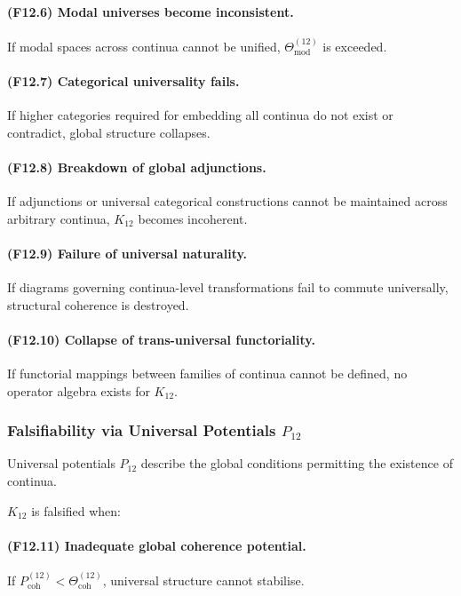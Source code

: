 \paragraph{(F12.6) Modal universes become inconsistent.}
If modal spaces across continua cannot be unified,  
$\Theta_{\mathrm{mod}}^{(12)}$ is exceeded.

\paragraph{(F12.7) Categorical universality fails.}
If higher categories required for embedding all continua do not exist or
contradict, global structure collapses.

\paragraph{(F12.8) Breakdown of global adjunctions.}
If adjunctions or universal categorical constructions cannot be
maintained across arbitrary continua, $K_{12}$ becomes incoherent.

\paragraph{(F12.9) Failure of universal naturality.}
If diagrams governing continua-level transformations fail to commute
universally, structural coherence is destroyed.

\paragraph{(F12.10) Collapse of trans-universal functoriality.}
If functorial mappings between families of continua cannot be defined,
no operator algebra exists for $K_{12}$.



\subsubsection{Falsifiability via Universal Potentials $P_{12}$}

Universal potentials $P_{12}$ describe the global conditions permitting
the existence of continua.

$K_{12}$ is falsified when:

\paragraph{(F12.11) Inadequate global coherence potential.}
If $P_{\mathrm{coh}}^{(12)} < \Theta_{\mathrm{coh}}^{(12)}$,  
universal structure cannot stabilise.


